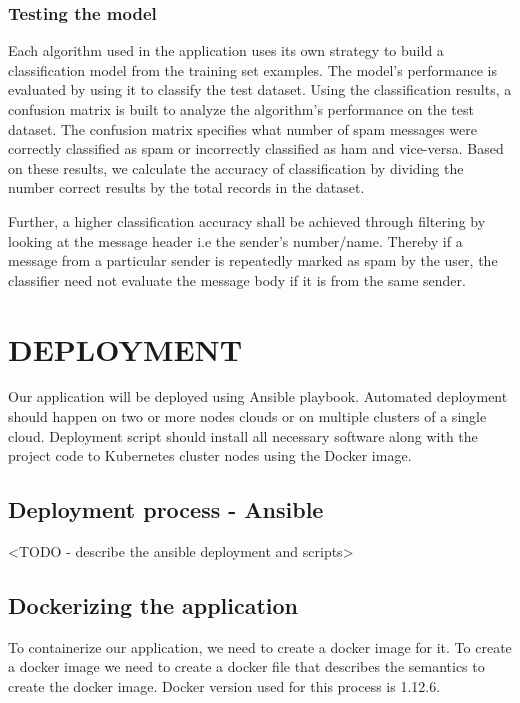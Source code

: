 \documentclass[9pt,twocolumn,twoside]{../../styles/osajnl}
\begin{document}
\subsubsection{Testing the model}

Each algorithm used in the application uses its own strategy to build
a classification model from the training set examples. The model's
performance is evaluated by using it to classify the test
dataset. Using the classification results, a confusion
matrix is built to analyze the algorithm's performance on the test dataset.
The confusion matrix specifies what number of spam messages were
correctly classified as spam or incorrectly classified as ham and
vice-versa. Based on these results, we calculate the accuracy of
classification by dividing the number correct results by the total
records in the dataset.

Further, a higher classification accuracy shall be achieved through
filtering by looking at the message header i.e the sender's
number/name. Thereby if a message from a particular sender is
repeatedly marked as spam by the user, the classifier need not
evaluate the message body if it is from the same sender.

\section{DEPLOYMENT}
Our application will be deployed using Ansible \cite{www-ansible}
playbook. Automated deployment should happen on two or more nodes
clouds or on multiple clusters of a single cloud. Deployment script
should install all necessary software along with the project code to
Kubernetes cluster nodes using the Docker image.

\subsection{Deployment process - Ansible}
<TODO - describe the ansible deployment and scripts>

\subsection{Dockerizing the application}
To containerize our application, we need to create a docker image for
it. To create a docker image we need to create a docker file that
describes the semantics to create the docker image. Docker version
used for this process is 1.12.6.
\end{document}
